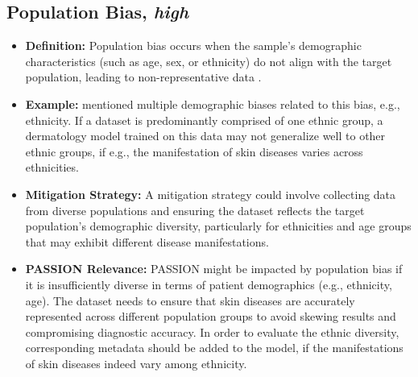 \documentclass[12pt, a4paper, oneside]{book}   	%
\begin{document}
\begin{appendices}
		\subsection{Population Bias, \textit{high}}
		\begin{itemize}
			\item \textbf{Definition:} Population bias occurs when the sample's demographic characteristics (such as age, sex, or ethnicity) do not align with the target population, leading to non-representative data \autocite{M120_Olteanu_2019, Mehrabi_2021}.
			\item \textbf{Example:} \textcite{M64_Hargittai_2007} mentioned multiple demographic biases related to this bias, e.g., ethnicity. If a dataset is predominantly comprised of one ethnic group, a dermatology model trained on this data may not generalize well to other ethnic groups, if e.g., the manifestation of skin diseases varies across ethnicities.
			\item \textbf{Mitigation Strategy:} A mitigation strategy could involve collecting data from diverse populations and ensuring the dataset reflects the target population’s demographic diversity, particularly for ethnicities and age groups that may exhibit different disease manifestations.
			\item \textbf{PASSION Relevance:} PASSION might be impacted by population bias if it is insufficiently diverse in terms of patient demographics (e.g., ethnicity, age). The dataset needs to ensure that skin diseases are accurately represented across different population groups to avoid skewing results and compromising diagnostic accuracy. In order to evaluate the ethnic diversity, corresponding metadata should be added to the model, if the manifestations of skin diseases indeed vary among ethnicity.
		\end{itemize}
		

\end{appendices}
\end{document}
